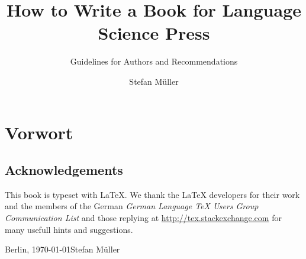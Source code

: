 \documentclass[ number=??
			   ,series=lnls,
			   ,output=long    %
			   ,draftmode  
			  ]{langsci}
\title{How to Write a Book for Language Science Press}
\subtitle{Guidelines for Authors and \latex Recommendations}
\author{Stefan Müller}
\begin{document}
               
         
                                                                           
                                  
\maketitle                

\frontmatter

\chapter*{Vorwort}

\lipsum[3-10]  

\section*{Acknowledgements}


This book is typeset with \LaTeX. We thank the \LaTeX{} developers for their work and the members of the German \textit{German
  Language TeX Users Group Communication List} and those replying at \url{http://tex.stackexchange.com} for many usefull hints and suggestions.


\bigskip

\noindent
Berlin, \today\hfill Stefan Müller


\tableofcontents      

\mainmatter         






\backmatter



                              
\end{document}

